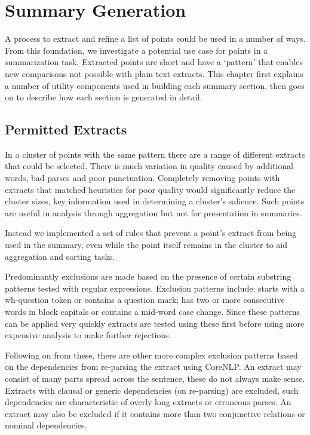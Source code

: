 \chapter{Summary Generation\label{chap:summary-generation}}
  A process to extract and refine a list of points could be used in a number of ways. From this foundation, we investigate a potential use case for points in a summarization task. Extracted points are short and have a `pattern' that enables new comparisons not possible with plain text extracts. This chapter first explains a number of utility components used in building each summary section, then goes on to describe how each section is generated in detail.

  \section{Permitted Extracts}
    In a cluster of points with the same pattern there are a range of different extracts that could be selected. There is much variation in quality caused by additional words, bad parses and poor punctuation. Completely removing points with extracts that matched heuristics for poor quality would significantly reduce the cluster sizes, key information used in determining a cluster's salience. Such points are useful in analysis through aggregation but not for presentation in summaries.

    Instead we implemented a set of rules that prevent a point's extract from being used in the summary, even while the point itself remains in the cluster to aid aggregation and sorting tasks.

    Predominantly exclusions are made based on the presence of certain substring patterns tested with regular expressions. Exclusion patterns include: starts with a wh-question token or contains a question mark; has two or more consecutive words in block capitals or contains a mid-word case change. Since these patterns can be applied very quickly extracts are tested using these first before using more expensive analysis to make further rejections.

    Following on from these, there are other more complex exclusion patterns based on the dependencies from re-parsing the extract using CoreNLP. An extract may consist of many parts spread across the sentence, these do not always make sense. Extracts with clausal or generic dependencies (on re-parsing) are excluded, such dependencies are characteristic of overly long extracts or erroneous parses. An extract may also be excluded if it contains more than two conjunctive relations or nominal dependencies.

